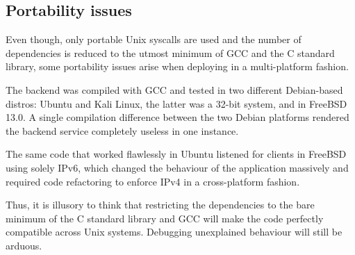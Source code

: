 \subsection{Portability issues}
Even though, only portable Unix syscalls are used and the number of dependencies is reduced to the utmost minimum of GCC and the C standard library, some portability issues arise when deploying in a multi-platform fashion.

The backend was compiled with GCC and tested in two different Debian-based distros: Ubuntu and Kali Linux, the latter was a 32-bit system, and in FreeBSD 13.0. A single compilation difference between the two Debian platforms rendered the backend service completely useless in one instance. 


The same code that worked flawlessly in Ubuntu listened for clients in FreeBSD using solely IPv6, which changed the behaviour of the application massively and required code refactoring to enforce IPv4 in a cross-platform fashion.

Thus, it is illusory to think that restricting the dependencies to the bare minimum of the C standard library and GCC will make the code perfectly compatible across Unix systems. Debugging unexplained behaviour will still be arduous.